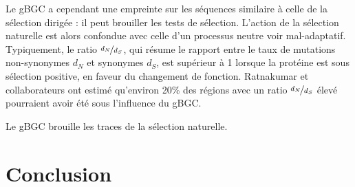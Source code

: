 \documentclass[11pt, oneside]{scrartcl}
\begin{document}
Le gBGC a cependant une empreinte sur les séquences similaire à celle de la
sélection dirigée : il peut brouiller les tests de sélection. L'action de la
sélection naturelle est alors confondue avec celle d'un processus neutre voir
mal-adaptatif. Typiquement, le ratio \(\nicefrac{d_N}{d_S}\), qui résume le
rapport entre le taux de mutations non-synonymes \(d_N\) et synonymes \(d_S\), est
supérieur à 1 lorsque la protéine est sous sélection positive, en faveur du
changement de fonction. Ratnakumar et collaborateurs ont estimé qu'environ 20\%
des régions avec un ratio \(\nicefrac{d_N}{d_S}\) élevé pourraient avoir été sous
l'influence du gBGC. 

Le gBGC brouille les traces de la sélection naturelle.  
\section*{Conclusion}
\label{sec:orgheadline18}

\end{document}
